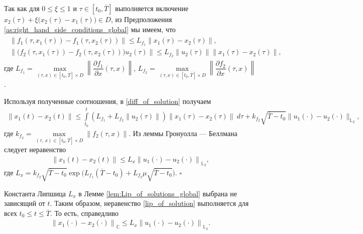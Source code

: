 \documentclass[../main.tex]{subfiles}
\begin{document}
	Так как для $0 \leqslant \xi \leqslant 1 $ и  $\tau \in [t_0,\overline{T}]$ выполняется включение $x_2(\tau) + \xi \big(x_2(\tau) - x_1(\tau)\big) \in D$, из Предположения \ref{as:right_hand_side_conditions_global} мы имеем, что 
	\begin{gather}\label{lip_f}
		\begin{gathered}
		 \big\| f_1(\tau, x_1(\tau)) - f_1(\tau, x_2(\tau)) \big\| \leqslant L_{f_1} \|x_1(\tau) - x_2(\tau)\|, \\
		 \left\| \Big(f_2(\tau, x_1(\tau)) - f_2(\tau, x_2(\tau)) \Big) u_2(\tau) \right\| \leqslant  L_{f_2} \|u_2(\tau)\| \|x_1(\tau) - x_2(\tau)\|,
		 \end{gathered}
  	\end{gather}
  	где  $L_{f_1} = \max\limits_{(\tau, x ) \in  [t_0, \overline{T}] \times D} \left\| \dfrac{\partial f_1}{\partial x} (\tau, x) \right\| $, $L_{f_2} = \max\limits_{(\tau, x ) \in  [t_0, \overline{T}] \times D}  \left\| \dfrac{\partial f_2}{\partial x} (\tau, x) \right\|$ .
  	
  	Используя полученные соотношения, в \eqref{diff_of_solution} получаем
  	\begin{gather*}
  		\| x_1(t) - x_2(t) \| \leqslant \int\limits_{t_0}^{t} (L_{f_1} + L_{f_2} \| u_2(\tau)\|)  \|x_1(\tau) - x_2(\tau)\| \ d\tau +  k_{f_2} \sqrt{\overline{T} - t_0} \| u_1(\cdot) - u_2(\cdot) \|_{\mathbb{L}_2},
  	\end{gather*}
  	где $ k_{f_2} = \max\limits_{(\tau,\, x ) \in  [t_0, \overline{T}] \times D}  \|  f_2 (\tau, x) \| $. Из леммы Гронуолла — Беллмана \cite{Bellman} следует неравенство
  	\begin{gather}\label{lip_of_solution}
  		\left\| x_1(t) - x_2(t) \right\| \leqslant L_x \left\|u_1(\cdot) - u_2(\cdot) \right\|_{\mathbb{L}_2}, 
  	\end{gather}
  	где $L_x = k_{f_2} \sqrt{\overline{T} - t_0}  \exp\big(L_{f_1}(\overline{T} - t_0)  + L_{f_2}  \mu\sqrt{\overline{T} - t_0}\big)$.
	\hfill $\square$
	\begin{zam}
		Константа Липшица $L_x$ в Лемме \ref{lem:Lip_of_solutions_global} выбрана не зависящий от $t$. Таким образом, неравенство \eqref{lip_of_solution} выполняется для всех $t_0 \leqslant t \leqslant \overline{T}$.  То есть, справедливо 
		\begin{gather}
					\left\| x_1(\cdot) - x_2(\cdot) \right\|_\mathbb{C} \leqslant L_x \left\|u_1(\cdot) - u_2(\cdot) \right\|_{\mathbb{L}_2}.
		\end{gather}
	\end{zam}
	
\end{document}
